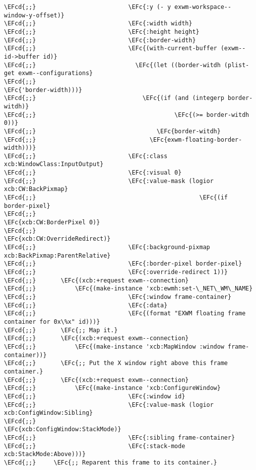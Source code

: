 \documentclass[a4wide,10pt]{article}
\newcommand{\EFc}[1]{\textcolor{EFc}{#1}} %
\newcommand{\EFcd}[1]{\textcolor{EFcd}{#1}} %
\begin{document}
\begin{Code}
\begin{Verbatim}
\EFcd{;;}                          \EFc{:y (- y exwm-workspace--window-y-offset)}
\EFcd{;;}                          \EFc{:width width}
\EFcd{;;}                          \EFc{:height height}
\EFcd{;;}                          \EFc{:border-width}
\EFcd{;;}                          \EFc{(with-current-buffer (exwm--id->buffer id)}
\EFcd{;;}                            \EFc{(let ((border-witdh (plist-get exwm--configurations}
\EFcd{;;}                                                           \EFc{'border-width)))}
\EFcd{;;}                              \EFc{(if (and (integerp border-witdh)}
\EFcd{;;}                                       \EFc{(>= border-witdh 0))}
\EFcd{;;}                                  \EFc{border-witdh}
\EFcd{;;}                                \EFc{exwm-floating-border-width)))}
\EFcd{;;}                          \EFc{:class xcb:WindowClass:InputOutput}
\EFcd{;;}                          \EFc{:visual 0}
\EFcd{;;}                          \EFc{:value-mask (logior xcb:CW:BackPixmap}
\EFcd{;;}                                              \EFc{(if border-pixel}
\EFcd{;;}                                                  \EFc{xcb:CW:BorderPixel 0)}
\EFcd{;;}                                              \EFc{xcb:CW:OverrideRedirect)}
\EFcd{;;}                          \EFc{:background-pixmap xcb:BackPixmap:ParentRelative}
\EFcd{;;}                          \EFc{:border-pixel border-pixel}
\EFcd{;;}                          \EFc{:override-redirect 1))}
\EFcd{;;}       \EFc{(xcb:+request exwm--connection}
\EFcd{;;}           \EFc{(make-instance 'xcb:ewmh:set-\_NET\_WM\_NAME}
\EFcd{;;}                          \EFc{:window frame-container}
\EFcd{;;}                          \EFc{:data}
\EFcd{;;}                          \EFc{(format "EXWM floating frame container for 0x\%x" id)))}
\EFcd{;;}       \EFc{;; Map it.}
\EFcd{;;}       \EFc{(xcb:+request exwm--connection}
\EFcd{;;}           \EFc{(make-instance 'xcb:MapWindow :window frame-container))}
\EFcd{;;}       \EFc{;; Put the X window right above this frame container.}
\EFcd{;;}       \EFc{(xcb:+request exwm--connection}
\EFcd{;;}           \EFc{(make-instance 'xcb:ConfigureWindow}
\EFcd{;;}                          \EFc{:window id}
\EFcd{;;}                          \EFc{:value-mask (logior xcb:ConfigWindow:Sibling}
\EFcd{;;}                                              \EFc{xcb:ConfigWindow:StackMode)}
\EFcd{;;}                          \EFc{:sibling frame-container}
\EFcd{;;}                          \EFc{:stack-mode xcb:StackMode:Above)))}
\EFcd{;;}     \EFc{;; Reparent this frame to its container.}

\end{Verbatim}
\end{Code}
\end{document}
